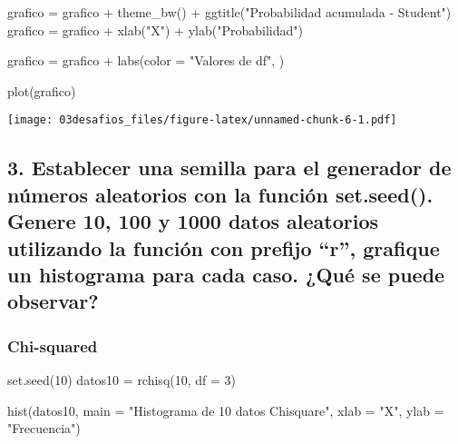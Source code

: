 \documentclass[
]{article}
\newenvironment{Shaded}{\begin{snugshade}}{\end{snugshade}}
\newcommand{\AttributeTok}[1]{\textcolor[rgb]{0.77,0.63,0.00}{#1}}
\newcommand{\DecValTok}[1]{\textcolor[rgb]{0.00,0.00,0.81}{#1}}
\newcommand{\FunctionTok}[1]{\textcolor[rgb]{0.00,0.00,0.00}{#1}}
\newcommand{\NormalTok}[1]{#1}
\newcommand{\OtherTok}[1]{\textcolor[rgb]{0.56,0.35,0.01}{#1}}
\newcommand{\SpecialCharTok}[1]{\textcolor[rgb]{0.00,0.00,0.00}{#1}}
\newcommand{\StringTok}[1]{\textcolor[rgb]{0.31,0.60,0.02}{#1}}
\begin{document}
\begin{Shaded}
\begin{Highlighting}[]
\NormalTok{grafico }\OtherTok{=}\NormalTok{ grafico }\SpecialCharTok{+} \FunctionTok{theme\_bw}\NormalTok{() }\SpecialCharTok{+} \FunctionTok{ggtitle}\NormalTok{(}\StringTok{"Probabilidad acumulada {-} Student"}\NormalTok{)}
\NormalTok{grafico }\OtherTok{=}\NormalTok{ grafico }\SpecialCharTok{+} \FunctionTok{xlab}\NormalTok{(}\StringTok{"X"}\NormalTok{) }\SpecialCharTok{+} \FunctionTok{ylab}\NormalTok{(}\StringTok{"Probabilidad"}\NormalTok{)}

\NormalTok{grafico }\OtherTok{=}\NormalTok{ grafico }\SpecialCharTok{+} \FunctionTok{labs}\NormalTok{(}\AttributeTok{color =} \StringTok{"Valores de df"}\NormalTok{, )}

\FunctionTok{plot}\NormalTok{(grafico)}
\end{Highlighting}
\end{Shaded}

\texttt{[image: 03desafios\_files/figure-latex/unnamed-chunk-6-1.pdf]}

\hypertarget{establecer-una-semilla-para-el-generador-de-nuxfameros-aleatorios-con-la-funciuxf3n-set.seed.-genere-10-100-y-1000-datos-aleatorios-utilizando-la-funciuxf3n-con-prefijo-r-grafique-un-histograma-para-cada-caso.-quuxe9-se-puede-observar}{%
\subsection{3. Establecer una semilla para el generador de números
aleatorios con la función set.seed(). Genere 10, 100 y 1000 datos
aleatorios utilizando la función con prefijo ``r'', grafique un
histograma para cada caso. ¿Qué se puede
observar?}\label{establecer-una-semilla-para-el-generador-de-nuxfameros-aleatorios-con-la-funciuxf3n-set.seed.-genere-10-100-y-1000-datos-aleatorios-utilizando-la-funciuxf3n-con-prefijo-r-grafique-un-histograma-para-cada-caso.-quuxe9-se-puede-observar}}

\hypertarget{chi-squared-2}{%
\subsubsection{Chi-squared}\label{chi-squared-2}}

\begin{Shaded}
\begin{Highlighting}[]
\FunctionTok{set.seed}\NormalTok{(}\DecValTok{10}\NormalTok{)}
\NormalTok{datos10 }\OtherTok{=} \FunctionTok{rchisq}\NormalTok{(}\DecValTok{10}\NormalTok{, }\AttributeTok{df =} \DecValTok{3}\NormalTok{)}

\FunctionTok{hist}\NormalTok{(datos10, }\AttributeTok{main =} \StringTok{"Histograma de 10 datos Chisquare"}\NormalTok{, }\AttributeTok{xlab =} \StringTok{"X"}\NormalTok{, }\AttributeTok{ylab =} \StringTok{"Frecuencia"}\NormalTok{)}
\end{Highlighting}
\end{Shaded}
\end{document}
